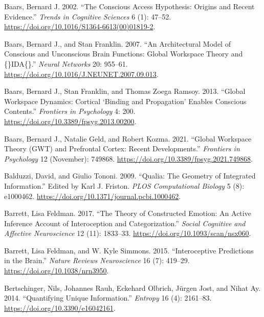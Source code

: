 \documentclass[
  a4paper]{article}
\newlength{\cslhangindent}
\newenvironment{CSLReferences}[2] %
 {\begin{list}{}{%
  \setlength{\itemindent}{0pt}
  \setlength{\leftmargin}{0pt}
  \setlength{\parsep}{0pt}
  \ifodd #1
   \setlength{\leftmargin}{\cslhangindent}
   \setlength{\itemindent}{-1\cslhangindent}
  \fi
  \setlength{\itemsep}{#2\baselineskip}}}
 {\end{list}}
\begin{document}
\begin{CSLReferences}{1}{0}
Baars, Bernard J. 2002. {``The Conscious Access Hypothesis: Origins and
Recent Evidence.''} \emph{Trends in Cognitive Sciences} 6 (1): 47--52.
\url{https://doi.org/10.1016/S1364-6613(00)01819-2}.

Baars, Bernard J., and Stan Franklin. 2007. {``An Architectural Model of
Conscious and Unconscious Brain Functions: {Global} Workspace Theory and
\{\vphantom\}{IDA}\vphantom\{\}.''} \emph{Neural Networks} 20: 955--61.
\url{https://doi.org/10.1016/J.NEUNET.2007.09.013}.

Baars, Bernard J., Stan Franklin, and Thomas Zoega Ramsoy. 2013.
{``Global Workspace Dynamics: Cortical {`Binding and Propagation'}
Enables Conscious Contents.''} \emph{Frontiers in Psychology} 4: 200.
\url{https://doi.org/10.3389/fpsyg.2013.00200}.

Baars, Bernard J., Natalie Geld, and Robert Kozma. 2021. {``Global
Workspace Theory ({GWT}) and Prefrontal Cortex: Recent Developments.''}
\emph{Frontiers in Psychology} 12 (November): 749868.
\url{https://doi.org/10.3389/fpsyg.2021.749868}.

Balduzzi, David, and Giulio Tononi. 2009. {``Qualia: The Geometry of
Integrated Information.''} Edited by Karl J. Friston. \emph{PLOS
Computational Biology} 5 (8): e1000462.
\url{https://doi.org/10.1371/journal.pcbi.1000462}.

Barrett, Lisa Feldman. 2017. {``The Theory of Constructed Emotion: An
Active Inference Account of Interoception and Categorization.''}
\emph{Social Cognitive and Affective Neuroscience} 12 (11): 1833--33.
\url{https://doi.org/10.1093/scan/nsx060}.

Barrett, Lisa Feldman, and W. Kyle Simmons. 2015. {``Interoceptive
Predictions in the Brain.''} \emph{Nature Reviews Neuroscience} 16 (7):
419--29. \url{https://doi.org/10.1038/nrn3950}.

Bertschinger, Nils, Johannes Rauh, Eckehard Olbrich, Jürgen Jost, and
Nihat Ay. 2014. {``Quantifying Unique Information.''} \emph{Entropy} 16
(4): 2161--83. \url{https://doi.org/10.3390/e16042161}.


\end{CSLReferences}
\end{document}
